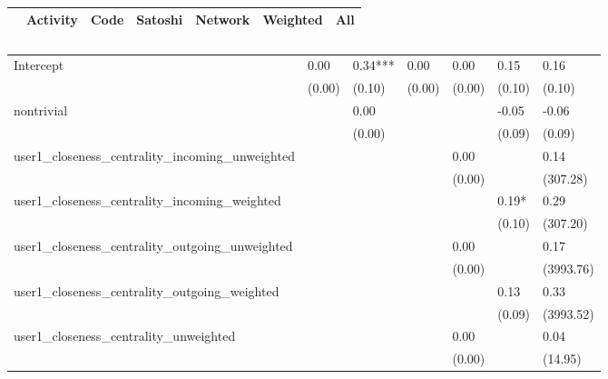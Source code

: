 \begin{table}
\caption{}
\begin{center}
\begin{tabular}{lcccccc}
\hline
                                               & Activity &   Code  & Satoshi & Network &   Weighted   &     All       \\
\hline
\hline
\end{tabular}
\begin{tabular}{lllllll}
Intercept                                      & 0.00     & 0.34*** & 0.00    & 0.00    & 0.15         & 0.16          \\
                                               & (0.00)   & (0.10)  & (0.00)  & (0.00)  & (0.10)       & (0.10)        \\
nontrivial                                     &          & 0.00    &         &         & -0.05        & -0.06         \\
                                               &          & (0.00)  &         &         & (0.09)       & (0.09)        \\
user1_closeness_centrality_incoming_unweighted &          &         &         & 0.00    &              & 0.14          \\
                                               &          &         &         & (0.00)  &              & (307.28)      \\
user1_closeness_centrality_incoming_weighted   &          &         &         &         & 0.19*        & 0.29          \\
                                               &          &         &         &         & (0.10)       & (307.20)      \\
user1_closeness_centrality_outgoing_unweighted &          &         &         & 0.00    &              & 0.17          \\
                                               &          &         &         & (0.00)  &              & (3993.76)     \\
user1_closeness_centrality_outgoing_weighted   &          &         &         &         & 0.13         & 0.33          \\
                                               &          &         &         &         & (0.09)       & (3993.52)     \\
user1_closeness_centrality_unweighted          &          &         &         & 0.00    &              & 0.04          \\
                                               &          &         &         & (0.00)  &              & (14.95)       \\

\end{tabular}
\end{center}
\end{table}
